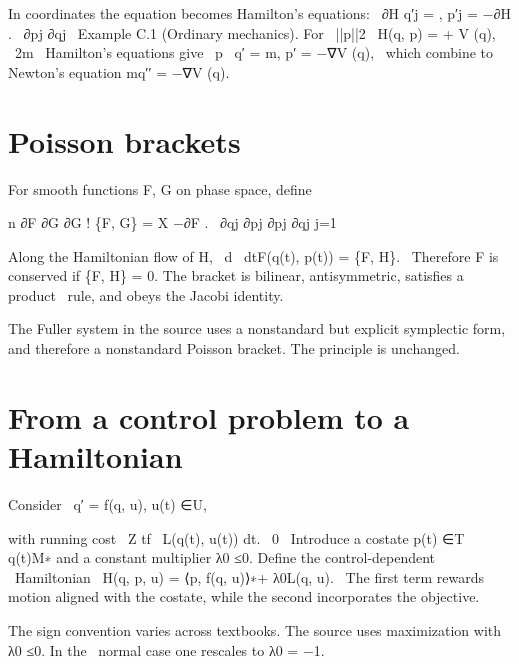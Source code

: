 \begin{displaytext}
In coordinates the equation becomes Hamilton’s equations: \
∂H q′j = , p′j = −∂H . \
∂pj ∂qj \
Example C.1 (Ordinary mechanics). For \
||p||2 \
H(q, p) = + V (q), \
2m \
Hamilton’s equations give \
p \
q′ = m, p′ = −∇V (q), \
which combine to Newton’s equation mq′′ = −∇V (q).
\end{displaytext}

\section{Poisson brackets}

For smooth functions F, G on phase space, define


\begin{displaytext}
n ∂F ∂G ∂G ! \{F, G\} = X −∂F . \
∂qj ∂pj ∂pj ∂qj j=1
\end{displaytext}

\begin{displaytext}
Along the Hamiltonian flow of H, \
d \
dtF(q(t), p(t)) = \{F, H\}. \
Therefore F is conserved if \{F, H\} = 0. The bracket is bilinear, antisymmetric, satisfies a product \
rule, and obeys the Jacobi identity.
\end{displaytext}

The Fuller system in the source uses a nonstandard but explicit symplectic form, and therefore a nonstandard Poisson bracket. The principle is unchanged.


\section{From a control problem to a Hamiltonian}

\begin{displaytext}
Consider \
q′ = f(q, u), u(t) ∈U,
\end{displaytext}

\begin{displaytext}
with running cost \
Z tf \
L(q(t), u(t)) dt. \
0 \
Introduce a costate p(t) ∈T q(t)M∗ and a constant multiplier λ0 ≤0. Define the control-dependent \
Hamiltonian \
H(q, p, u) = ⟨p, f(q, u)⟩∗+ λ0L(q, u). \
The first term rewards motion aligned with the costate, while the second incorporates the objective.
\end{displaytext}

\begin{displaytext}
The sign convention varies across textbooks. The source uses maximization with λ0 ≤0. In the \
normal case one rescales to λ0 = −1.
\end{displaytext}

